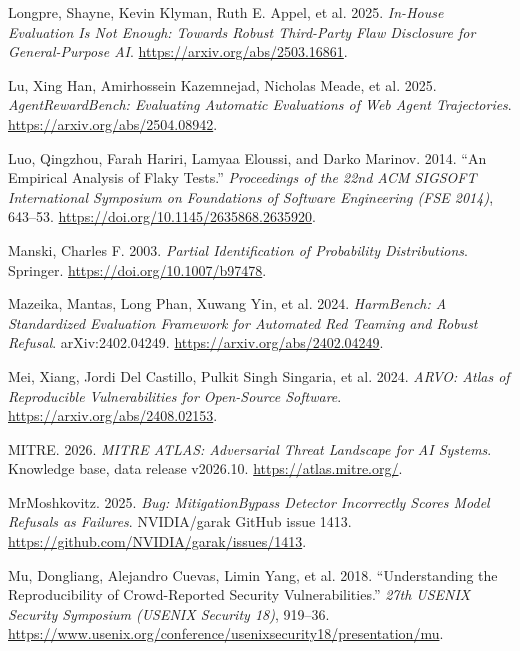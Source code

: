\documentclass[
  american,
  10pt,
  a4paper,
]{article}
\newlength{\cslhangindent}
\newenvironment{CSLReferences}[2] %
 {\begin{list}{}{%
  \setlength{\itemindent}{0pt}
  \setlength{\leftmargin}{0pt}
  \setlength{\parsep}{0pt}
  \ifodd #1
   \setlength{\leftmargin}{\cslhangindent}
   \setlength{\itemindent}{-1\cslhangindent}
  \fi
  \setlength{\itemsep}{#2\baselineskip}}}
 {\end{list}}
\begin{document}
\begin{CSLReferences}{1}{1}
Longpre, Shayne, Kevin Klyman, Ruth E. Appel, et al. 2025.
\emph{In-House Evaluation Is Not Enough: Towards Robust Third-Party Flaw
Disclosure for General-Purpose {AI}}.
\url{https://arxiv.org/abs/2503.16861}.

Lu, Xing Han, Amirhossein Kazemnejad, Nicholas Meade, et al. 2025.
\emph{AgentRewardBench: Evaluating Automatic Evaluations of Web Agent
Trajectories}. \url{https://arxiv.org/abs/2504.08942}.

Luo, Qingzhou, Farah Hariri, Lamyaa Eloussi, and Darko Marinov. 2014.
{``An Empirical Analysis of Flaky Tests.''} \emph{Proceedings of the
22nd ACM SIGSOFT International Symposium on Foundations of Software
Engineering (FSE 2014)}, 643--53.
\url{https://doi.org/10.1145/2635868.2635920}.

Manski, Charles F. 2003. \emph{Partial Identification of Probability
Distributions}. Springer. \url{https://doi.org/10.1007/b97478}.

Mazeika, Mantas, Long Phan, Xuwang Yin, et al. 2024. \emph{{HarmBench}:
A Standardized Evaluation Framework for Automated Red Teaming and Robust
Refusal}. arXiv:2402.04249. \url{https://arxiv.org/abs/2402.04249}.

Mei, Xiang, Jordi Del Castillo, Pulkit Singh Singaria, et al. 2024.
\emph{{ARVO}: Atlas of Reproducible Vulnerabilities for Open-Source
Software}. \url{https://arxiv.org/abs/2408.02153}.

MITRE. 2026. \emph{{MITRE ATLAS}: Adversarial Threat Landscape for {AI}
Systems}. Knowledge base, data release v2026.10.
\url{https://atlas.mitre.org/}.

MrMoshkovitz. 2025. \emph{Bug: {MitigationBypass} Detector Incorrectly
Scores Model Refusals as Failures}. NVIDIA/garak GitHub issue 1413.
\url{https://github.com/NVIDIA/garak/issues/1413}.

Mu, Dongliang, Alejandro Cuevas, Limin Yang, et al. 2018.
{``Understanding the Reproducibility of Crowd-Reported Security
Vulnerabilities.''} \emph{27th USENIX Security Symposium (USENIX
Security 18)}, 919--36.
\url{https://www.usenix.org/conference/usenixsecurity18/presentation/mu}.


\end{CSLReferences}
\end{document}
